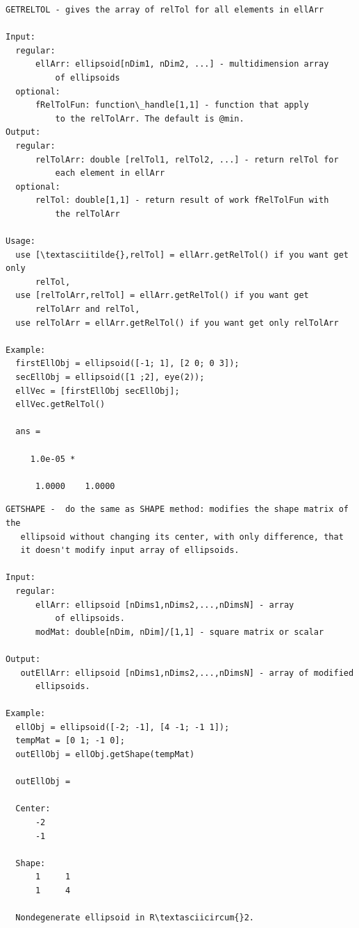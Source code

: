 \documentclass[letterpaper,10pt,english]{sphinxmanual}
\begin{document}
\begin{Verbatim}[commandchars=\\\{\}]
GETRELTOL - gives the array of relTol for all elements in ellArr

Input:
  regular:
      ellArr: ellipsoid[nDim1, nDim2, ...] - multidimension array
          of ellipsoids
  optional:
      fRelTolFun: function\_handle[1,1] - function that apply
          to the relTolArr. The default is @min.
Output:
  regular:
      relTolArr: double [relTol1, relTol2, ...] - return relTol for
          each element in ellArr
  optional:
      relTol: double[1,1] - return result of work fRelTolFun with
          the relTolArr

Usage:
  use [\textasciitilde{},relTol] = ellArr.getRelTol() if you want get only
      relTol,
  use [relTolArr,relTol] = ellArr.getRelTol() if you want get
      relTolArr and relTol,
  use relTolArr = ellArr.getRelTol() if you want get only relTolArr

Example:
  firstEllObj = ellipsoid([-1; 1], [2 0; 0 3]);
  secEllObj = ellipsoid([1 ;2], eye(2));
  ellVec = [firstEllObj secEllObj];
  ellVec.getRelTol()

  ans =

     1.0e-05 *

      1.0000    1.0000
\end{Verbatim}

\begin{Verbatim}[commandchars=\\\{\}]
GETSHAPE -  do the same as SHAPE method: modifies the shape matrix of the
   ellipsoid without changing its center, with only difference, that
   it doesn't modify input array of ellipsoids.

Input:
  regular:
      ellArr: ellipsoid [nDims1,nDims2,...,nDimsN] - array
          of ellipsoids.
      modMat: double[nDim, nDim]/[1,1] - square matrix or scalar

Output:
   outEllArr: ellipsoid [nDims1,nDims2,...,nDimsN] - array of modified
      ellipsoids.

Example:
  ellObj = ellipsoid([-2; -1], [4 -1; -1 1]);
  tempMat = [0 1; -1 0];
  outEllObj = ellObj.getShape(tempMat)

  outEllObj =

  Center:
      -2
      -1

  Shape:
      1     1
      1     4

  Nondegenerate ellipsoid in R\textasciicircum{}2.
\end{Verbatim}
\end{document}
